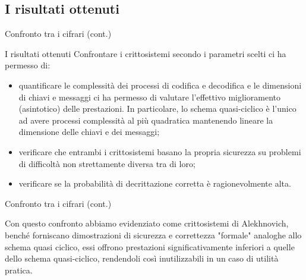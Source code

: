 \documentclass[10pt]{beamer}
\begin{document}
		\subsection{I risultati ottenuti}
			\begin{frame}{Confronto tra i cifrari (cont.)}
				\begin{block}{I risultati ottenuti}
					Confrontare i crittosistemi secondo i parametri scelti ci ha permesso di:
					\begin{itemize}
						\item quantificare le complessità dei processi di codifica e decodifica e le dimensioni di chiavi e messaggi ci ha permesso di valutare l'effettivo miglioramento (asintotico) delle prestazioni. In particolare, lo schema quasi-ciclico è l'unico ad avere processi complessità al più quadratica mantenendo lineare la dimensione delle chiavi e dei messaggi;
						\item verificare che entrambi i crittosistemi basano la propria sicurezza su problemi di difficoltà non strettamente diversa tra di loro;
						\item verificare se la probabilità di decrittazione corretta è ragionevolmente alta.
					\end{itemize}
				\end{block}
			\end{frame}
			\begin{frame}{Confronto tra i cifrari (cont.)}
				\begin{block}{}
					Con questo confronto abbiamo evidenziato come crittosistemi di Alekhnovich, benché forniscano dimostrazioni di sicurezza e correttezza "formale" analoghe allo schema quasi ciclico, essi offrono prestazioni significativamente inferiori a quelle dello schema quasi-ciclico, rendendoli così inutilizzabili in un caso di utilità pratica.
				\end{block}
			\end{frame}
\end{document}
